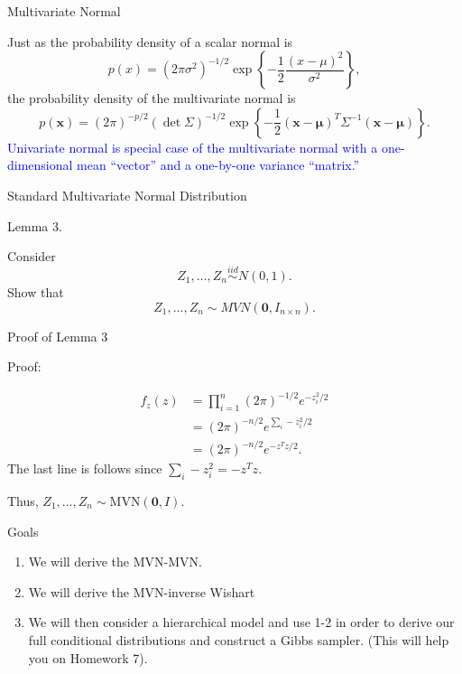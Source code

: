 \documentclass[
  ignorenonframetext,
]{beamer}
\providecommand{\tightlist}{%
  \setlength{\itemsep}{0pt}\setlength{\parskip}{0pt}}
\newcommand{\bmu}{\bm{\mu}}
\begin{document}
\begin{frame}{Multivariate Normal}
\protect\hypertarget{multivariate-normal}{}

Just as the probability density of a scalar normal is \begin{equation}
p(x) = {\left(2\pi\sigma^2\right)}^{-1/2}\exp{\left\{ -\frac{1}{2} \frac{(x-\mu)^2}{\sigma^2}\right\}},
\end{equation} the probability density of the multivariate normal is
\begin{equation}
p(\bm{x}) = {\left(2\pi\right)}^{-p/2}(\det{\Sigma})^{-1/2} \exp{\left\{-\frac{1}{2} (\bm{x}-\bmu)^T\Sigma^{-1} (\bm{x} - \bmu)\right\}}.
\end{equation}
\textcolor{blue}{Univariate normal is special case of the multivariate normal with a one-dimensional mean ``vector'' and a one-by-one variance ``matrix.''}

\end{frame}

\begin{frame}{Standard Multivariate Normal Distribution}
\protect\hypertarget{standard-multivariate-normal-distribution}{}

Lemma 3.

Consider \[Z_1, \ldots, Z_n \stackrel{iid}{\sim} N(0,1).\] Show that
\[Z_1,\ldots,Z_n \sim MVN(\textbf{0},I_{n \times n}).\]

\end{frame}

\begin{frame}{Proof of Lemma 3}
\protect\hypertarget{proof-of-lemma-3}{}

Proof:

\begin{align}
f_z(z) &= \prod_{i=1}^n (2\pi)^{-1/2} e^{-z_i^2/2}\\
& = (2\pi)^{-n/2} e^{\sum_i-z_i^2/2}\\
& = (2\pi)^{-n/2} e^{-z^Tz/2}.
\end{align} The last line is follows since \(\sum_i-z_i^2 = -z^Tz.\)

Thus, \(Z_1,\ldots,Z_n \sim \text{MVN}(\textbf{0},I).\)

\end{frame}

\begin{frame}{Goals}
\protect\hypertarget{goals}{}

\begin{enumerate}
\tightlist
\item
  We will derive the MVN-MVN.
\item
  We will derive the MVN-inverse Wishart
\item
  We will then consider a hierarchical model and use 1-2 in order to
  derive our full conditional distributions and construct a Gibbs
  sampler. (This will help you on Homework 7).
\end{enumerate}

\end{frame}
\end{document}
